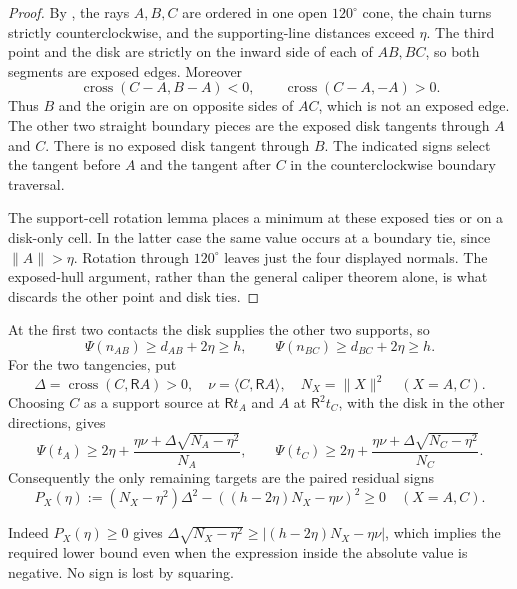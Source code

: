 \begin{proof}
By , the rays $A,B,C$ are
ordered in one open $120^\circ$ cone, the chain turns strictly
counterclockwise, and the supporting-line distances exceed $\eta$.
The third point and the disk are strictly on the inward side of each of
$AB,BC$, so both segments are exposed edges. Moreover
\[
 \operatorname{cross}(C-A,B-A)<0,
 \qquad \operatorname{cross}(C-A,-A)>0.
\]
Thus $B$ and the origin are on opposite sides of $AC$, which is not an
exposed edge. The other two straight boundary pieces are the exposed disk
tangents through $A$ and $C$. There is no exposed disk tangent through $B$.
The indicated signs select the tangent before $A$ and the tangent after $C$
in the counterclockwise boundary traversal.

The support-cell rotation lemma  places
a minimum at these exposed ties or on a disk-only cell. In the latter case
the same value occurs at a boundary tie, since $\|A\|>\eta$.
Rotation through $120^\circ$ leaves just the four displayed normals.
The exposed-hull argument, rather than the general caliper theorem alone,
is what discards the other point and disk ties.
\end{proof}


At the first two contacts the disk supplies the other two supports, so
\begin{equation}
 \Psi(n_{AB})\ge d_{AB}+2\eta\ge h,\qquad
 \Psi(n_{BC})\ge d_{BC}+2\eta\ge h.
 \label{eq:four-contact-line-tests}
\end{equation}
For the two tangencies, put
\[
 \Delta=\operatorname{cross}(C,\mathsf RA)>0,\quad
 \nu=\langle C,\mathsf RA\rangle,\quad N_X=\|X\|^2\quad(X=A,C).
\]
Choosing $C$ as a support source at $\mathsf Rt_A$ and $A$ at
$\mathsf R^2t_C$, with the disk in the other directions, gives
\begin{equation}
 \Psi(t_A)\ge2\eta+
 \frac{\eta\nu+\Delta\sqrt{N_A-\eta^2}}{N_A},\qquad
 \Psi(t_C)\ge2\eta+
 \frac{\eta\nu+\Delta\sqrt{N_C-\eta^2}}{N_C}.
 \label{eq:four-contact-tangent-tests}
\end{equation}
Consequently the only remaining targets are the paired residual signs
\begin{equation}
 P_X(\eta):=(N_X-\eta^2)\Delta^2-
 ((h-2\eta)N_X-\eta\nu)^2\ge0\quad(X=A,C).
 \label{eq:four-contact-residuals}
\end{equation}


Indeed $P_X(\eta)\ge0$ gives
$\Delta\sqrt{N_X-\eta^2}\ge|(h-2\eta)N_X-\eta\nu|$, which implies the
required lower bound even when the expression inside the absolute value is
negative. No sign is lost by squaring.

